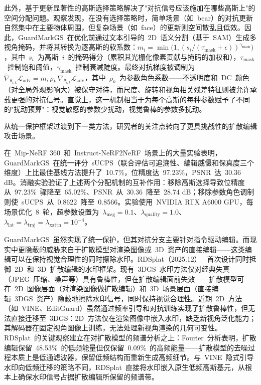 此外，基于更新显著性的高斯选择策略解决了"对抗信号应该施加在哪些高斯上"的空间分配问题。观察发现，在没有选择策略时，简单场景（如~bear）的对抗更新自然集中在主要物体周围，但复杂场景（如~face）的更新则空间散乱且低效。因此，GuardMarkGS~在优化前通过文本引导的~2D~语义分割（基于~SAM）生成多视角掩码，并将其转换为逐高斯的软系数：$m_i = \min\!\big(1, (s_i / (\tau_{\mathrm{mask}} + \epsilon))^{\gamma_{\mathrm{mask}}}\big)$，其中~$s_i$~为高斯~$i$~的掩码得分（累积其光栅化像素贡献与掩码的加权和），$\tau_{\mathrm{mask}}$~控制饱和阈值，$\gamma_{\mathrm{mask}}$~控制衰减陡度。最终对抗梯度被调制为~$\widetilde{\nabla}_{\theta_{i,k}}\mathcal{L}_{\mathrm{adv}} = m_i\,\rho_k\,\nabla_{\theta_{i,k}}\mathcal{L}_{\mathrm{adv}}$，其中~$\rho_k$~为参数角色系数——不透明度和~DC~颜色（对全局外观影响大）被保守对待，而尺度、旋转和视角相关残差特征则被允许承载更强的对抗信号。直觉上，这一机制相当于为每个高斯的每种参数赋予了不同的"扰动预算"：视觉敏感的参数少扰动，视觉鲁棒的参数多扰动。

从统一保护框架过渡到下一类方法，研究者的关注点转向了更具挑战性的扩散编辑攻击场景。

在~Mip-NeRF 360~和~Instruct-NeRF2NeRF~场景上的大量实验表明，GuardMarkGS~在统一评分~sUCPS（联合评估可追溯性、编辑威慑和保真度三个维度）上比最佳基线方法提升了~10.7\%，位精度达~97.23\%，PSNR~达~30.36 dB。消融实验验证了上述两个分配机制的互补作用：移除高斯选择导致位精度从~97.23\%~骤降至~65.02\%、PSNR~从~30.36~降至~28.74 dB；移除参数角色调制则使~sUCPS~从~0.8622~降至~0.8566。实验使用~NVIDIA RTX A6000 GPU，每场景优化~8~轮，超参数设置为~$\lambda_{\mathrm{msg}} = 0.1$、$\lambda_{\mathrm{quality}} = 1.0$、$\lambda_{\mathrm{lat}} = \lambda_{\mathrm{traj}} = \lambda_{\mathrm{xattn}} = 10^{-4}$。

GuardMarkGS~虽然实现了统一保护，但其对抗分支主要针对指令驱动编辑。而现实中更隐蔽的威胁来自于扩散模型对渲染图像或~3D~资产的直接编辑——这类编辑可以在保持视觉合理性的同时擦除水印。RDSplat（2025.12）~\cite{2512_06774} 首次设计同时抵御~2D~和~3D~扩散编辑的水印框架。现有~3DGS~水印方法仅对经典失真（JPEG~压缩、噪声等）具有鲁棒性，但在扩散编辑面前失效——扩散模型可在~2D~图像层面（对渲染图像做扩散编辑）和~3D~场景层面（直接编辑~3DGS~资产）隐蔽地擦除水印信号，同时保持视觉合理性。近期~2D~方法（如~VINE、EditGuard）虽然通过频率引导和对抗训练实现了扩散鲁棒性，但无法直接迁移至~3DGS：2D~方法仅在渲染图像中嵌入水印，缺乏新视角泛化能力；其解码器在固定视角图像上训练，无法处理新视角渲染的几何可变性。RDSplat~的关键观察建立在对扩散模型的频谱分析之上：Fourier~分析表明，扩散编辑保留~48.53\%~的低频能量但仅保留~0.09\%~的高频能量——扩散模型的去噪过程本质上是低通滤波器，保留低频结构而重新生成高频细节。与~VINE~隐式引导水印向低频迁移的策略不同，RDSplat~直接将水印嵌入原生低频高斯基元，从根本上确保水印信号占据扩散编辑所保留的频谱带。

